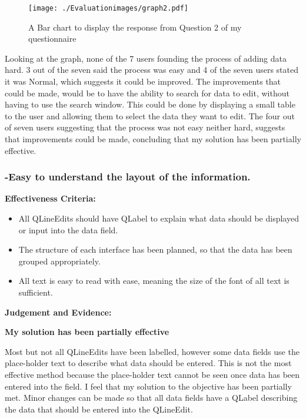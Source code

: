  \begin{figure}[H]
\caption{A Bar chart to display the response from Question 2 of my questionnaire} \label{graph2}
\hfill\texttt{[image: ./Evaluationimages/graph2.pdf]}
\end{figure}

Looking at the graph, none of the 7 users founding the process of adding data hard. 3 out of the seven said the process was easy and 4 of the seven users stated it was Normal, which suggests it could be improved. The improvements that could be made, would be to have the ability to search for data to edit, without having to use the search window. This could be done by displaying a small table to the user and allowing them to select the data they want to edit.
The four out of seven users suggesting that the process was not easy neither hard, suggests that improvements could be made, concluding that my solution has been partially effective.





\pagebreak
\subsubsection{-Easy to understand the layout of the information.}

\textbf{Effectiveness Criteria:}\newline
\begin{itemize}
	\item{All QLineEdits should have QLabel to explain what data should be displayed or input into the data field.}
	\item{The structure of each interface has been planned, so that the data has been grouped appropriately.}
	\item{All text is easy to read with ease, meaning the size of the font of all text is sufficient.}
\end{itemize}

\textbf{Judgement and Evidence:} \newline

\textbf{\large{My solution has been partially effective}}


Most but not all QLineEdits have been labelled, however some data fields use the place-holder text to describe what data should be entered. This is not the most effective method because the place-holder text cannot be seen once data has been entered into the field. I feel that my solution to the objective has been partially met. Minor changes can be made so that all data fields have a QLabel describing the data that should be entered into the QLineEdit.


